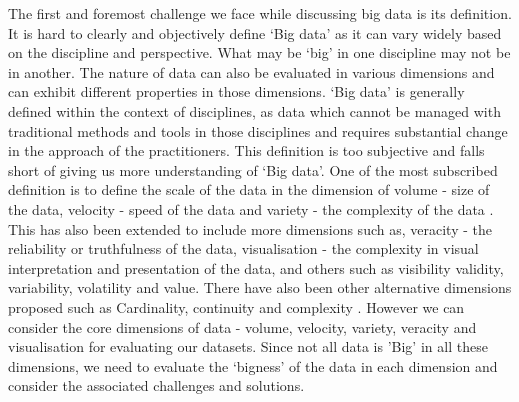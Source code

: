 The first and foremost challenge we face while discussing big data is its definition.
It is hard to clearly and objectively define `Big data' as it can vary widely based on the discipline and perspective.
What may be `big' in one discipline may not be in another.
The nature of data can also be evaluated in various dimensions and can exhibit different properties in those dimensions. 
`Big data' is generally defined within the context of disciplines, as data which cannot be managed with traditional methods and tools in those disciplines and requires substantial change in the approach of the practitioners.
This definition is too subjective and falls short of giving us more understanding of `Big data'.
One of the most subscribed definition is to define the scale of the data in the dimension of volume - size of the data, velocity - speed of the data and variety  - the complexity of the data \cite{laney2001}.
This has also been extended to include more dimensions such as, veracity - the reliability or truthfulness of the data, visualisation - the complexity in visual interpretation and presentation of the data, and others such as visibility validity, variability, volatility and value.
There have also been other alternative dimensions proposed such as Cardinality, continuity and complexity \cite{suthaharan2014}.
However we can consider the core dimensions of data - volume, velocity, variety, veracity and visualisation for evaluating our datasets.
Since not all data is 'Big' in all these dimensions, we need to evaluate the `bigness' of the data in each dimension and consider the associated challenges and solutions.


